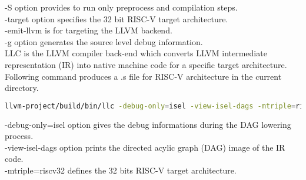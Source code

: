 -S option provides to run only preprocess and compilation steps. \\
-target option specifies the 32 bit RISC-V target architecture. \\
-emit-llvm is for targeting the LLVM backend. \\
-g option generates the source level debug information.\\

LLC is the LLVM compiler back-end which converts LLVM intermediate representation (IR) into native machine code for a specific target architecture. Following command produces a .s file for RISC-V architecture in the current directory. 

\begin{lstlisting}[language=Bash]
llvm-project/build/bin/llc -debug-only=isel -view-isel-dags -mtriple=riscv32 lxr.ll
\end{lstlisting}

-debug-only=isel option gives the debug informations during the DAG lowering process.\\
-view-isel-dags option prints the directed acylic graph (DAG) image of the IR code.\\
-mtriple=riscv32 defines the 32 bits RISC-V target architecture.\\
